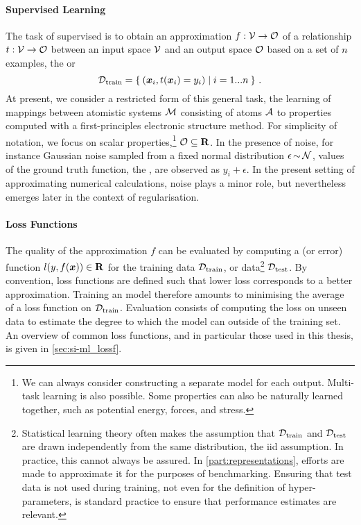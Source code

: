 \paragraph{Supervised Learning} The task of supervised \ml is to obtain an approximation $f: \mathcal{V} \rightarrow \mathcal{O}$ of a  relationship $t: \mathcal{V} \rightarrow \mathcal{O}$ between an input space $\mathcal{V}$ and an output space $\mathcal{O}$ based on a set of $n$ examples, the  or 
\begin{equation}
	\mathcal{D}_{\text{train}} = \Set{(\boldsymbol{x}_i, t(\boldsymbol{x}_i)=y_i) | i=1...n} \, .
\end{equation}
At present, we consider a restricted form of this general task, the learning of mappings between atomistic systems $\mathcal{M}$ consisting of atoms $\mathcal{A}$ to properties computed with a first-principles electronic structure method. For simplicity of notation, we focus on scalar properties,\footnote[][-1\baselineskip]{We can always consider constructing a separate model for each output. Multi-task learning is also possible. Some properties can also be naturally learned together, such as potential energy, forces, and stress.} $\mathcal{O} \subseteq {\bf R}$.
In the presence of noise, for instance Gaussian noise sampled from a fixed normal distribution $\epsilon{\,\sim\,}\mathcal{N}$, values of the ground truth function, the , are observed as $y_i + \epsilon$. In the present setting of approximating numerical \qm calculations, noise plays a minor role, but nevertheless emerges later in the context of regularisation.

\paragraph{Loss Functions} The quality of the approximation $f$ can be evaluated by computing a  (or error) function $l(y, f(\boldsymbol{x})) \in {\bf R}$ for the training data $\mathcal{D}_{\text{train}}$, or  data\footnote[][-4.0\baselineskip]{
	Statistical learning theory often makes the assumption that $\mathcal{D}_{\text{train}}$ and $\mathcal{D}_{\text{test}}$ are drawn independently from the same distribution, the \gls{iid} assumption. In practice, this cannot always be assured. In \cref{part:representations}, efforts are made to approximate it for the purposes of benchmarking. Ensuring that test data is not used during training, not even for the definition of hyper-parameters, is standard practice to ensure that performance estimates are relevant.
} $\mathcal{D}_{\text{test}}$. By convention, loss functions are defined such that lower loss corresponds to a better approximation. Training an \ml model therefore amounts to minimising the average of a loss function on $\mathcal{D}_{\text{train}}$. Evaluation consists of computing the loss on unseen data to estimate the degree to which the model can  outside of the training set. An overview of common loss functions, and in particular those used in this thesis, is given in \cref{sec:si-ml_lossf}.

